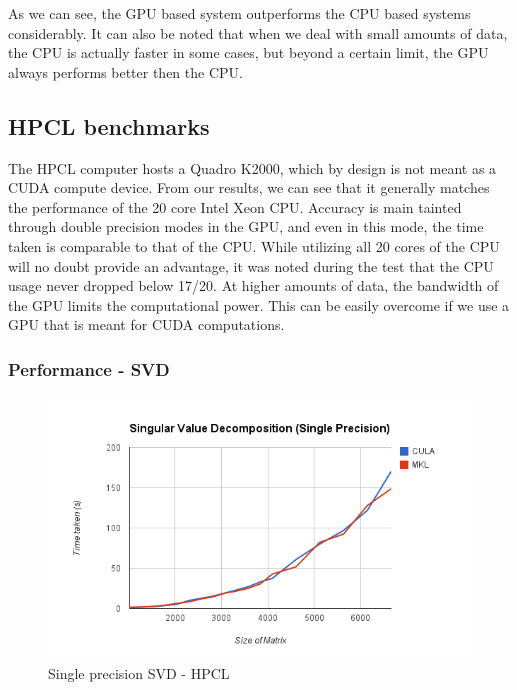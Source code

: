 \documentclass[submit]{aiaa-tc_mod}%
\begin{document}
As we can see, the GPU based system outperforms the CPU based systems considerably. It can also be noted that when we deal with small amounts of data, the CPU is actually faster in some cases, but beyond a certain limit, the GPU always performs better then the CPU.

\subsection{HPCL benchmarks}
The HPCL computer hosts a Quadro K2000, which by design is not meant as a CUDA compute device. From our results, we can see that it generally matches the performance of the 20 core Intel Xeon CPU. Accuracy is main tainted through double precision modes in the GPU, and even in this mode, the time taken is comparable to that of the CPU. While utilizing all 20 cores of the CPU will no doubt provide an advantage, it was noted during the test that the CPU usage never dropped below 17/20. At higher amounts of data, the bandwidth of the GPU limits the computational power. This can be easily overcome if we use a GPU that is meant for CUDA computations. 

\subsubsection{Performance - SVD}
\begin{figure}[H]
 \includegraphics[width=\textwidth]{hpclsgesvd.png}
 \caption{Single precision SVD - HPCL}
 \label{hpclsgesvd}
\end{figure}
\end{document}
